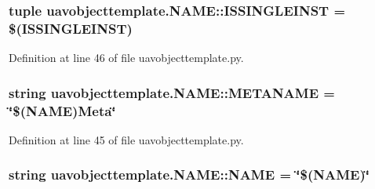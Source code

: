 \hypertarget{classuavobjecttemplate_1_1_n_a_m_e_afc79fbb87532580147383d40c5d7eb31}{
\subsubsection[{\-I\-S\-S\-I\-N\-G\-L\-E\-I\-N\-S\-T}]{\setlength{\rightskip}{0pt plus 5cm}tuple {\bf uavobjecttemplate.\-N\-A\-M\-E\-::\-I\-S\-S\-I\-N\-G\-L\-E\-I\-N\-S\-T} = \$({\bf \-I\-S\-S\-I\-N\-G\-L\-E\-I\-N\-S\-T})}}\label{classuavobjecttemplate_1_1_n_a_m_e_afc79fbb87532580147383d40c5d7eb31}


\-Definition at line 46 of file uavobjecttemplate.\-py.

\hypertarget{classuavobjecttemplate_1_1_n_a_m_e_a73916d6c625f956ee007d7b1e09ff097}{
\subsubsection[{\-M\-E\-T\-A\-N\-A\-M\-E}]{\setlength{\rightskip}{0pt plus 5cm}string {\bf uavobjecttemplate.\-N\-A\-M\-E\-::\-M\-E\-T\-A\-N\-A\-M\-E} = \char`\"{}\$(\-N\-A\-M\-E)\-Meta\char`\"{}}}\label{classuavobjecttemplate_1_1_n_a_m_e_a73916d6c625f956ee007d7b1e09ff097}


\-Definition at line 45 of file uavobjecttemplate.\-py.

\hypertarget{classuavobjecttemplate_1_1_n_a_m_e_aa4152a2f11973340936522b0ee53b625}{
\subsubsection[{\-N\-A\-M\-E}]{\setlength{\rightskip}{0pt plus 5cm}string {\bf uavobjecttemplate.\-N\-A\-M\-E\-::\-N\-A\-M\-E} = \char`\"{}\$(\-N\-A\-M\-E)\char`\"{}}}\label{classuavobjecttemplate_1_1_n_a_m_e_aa4152a2f11973340936522b0ee53b625}


